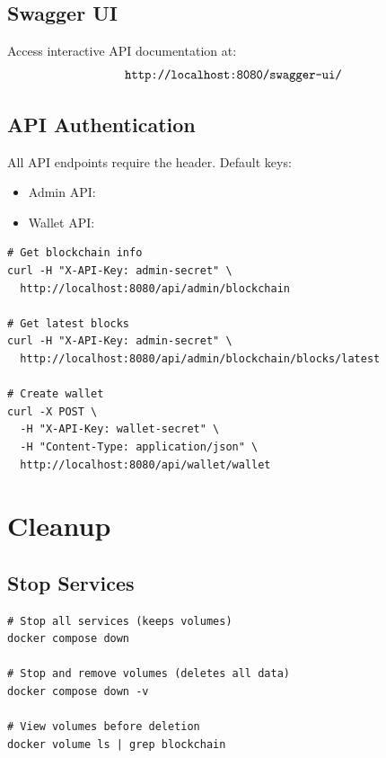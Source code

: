 \subsection{Swagger UI}

Access interactive API documentation at:
\begin{equation}
\text{\texttt{http://localhost:8080/swagger-ui/}}
\end{equation}

\subsection{API Authentication}

All API endpoints require the  header. Default keys:
\begin{itemize}
  \item Admin API: 
  \item Wallet API: 
\end{itemize}

\begin{listing}[htbp]
\caption{API Call Examples}
\label{lst:ch22-api-examples}
\begin{verbatim}
# Get blockchain info
curl -H "X-API-Key: admin-secret" \
  http://localhost:8080/api/admin/blockchain

# Get latest blocks
curl -H "X-API-Key: admin-secret" \
  http://localhost:8080/api/admin/blockchain/blocks/latest

# Create wallet
curl -X POST \
  -H "X-API-Key: wallet-secret" \
  -H "Content-Type: application/json" \
  http://localhost:8080/api/wallet/wallet
\end{verbatim}
\end{listing}

\section{Cleanup}
\label{sec:docker-cleanup}

\subsection{Stop Services}

\begin{listing}[H]
\caption{Stopping Docker Compose Services}
\label{lst:ch22-cleanup}
\begin{verbatim}
# Stop all services (keeps volumes)
docker compose down

# Stop and remove volumes (deletes all data)
docker compose down -v

# View volumes before deletion
docker volume ls | grep blockchain
\end{verbatim}
\end{listing}

